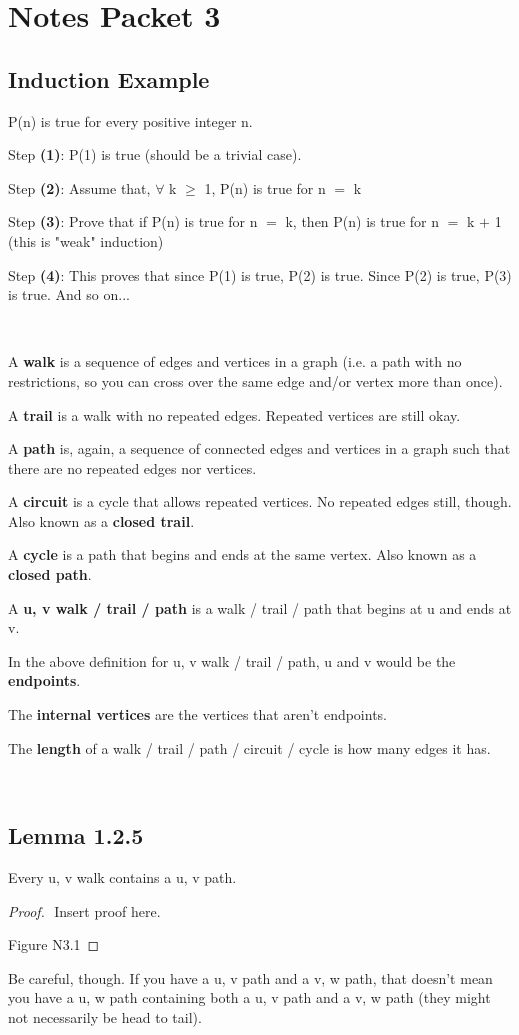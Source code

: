 \documentclass{article}
\newcommand{\mt}[1]{\ensuremath{#1}}
\newcommand\bsc[2][\DefaultOpt]{%
  \def\DefaultOpt{#2}%
  \section[#1]{#2}%
}
\newcommand\ssc[2][\DefaultOpt]{%
  \def\DefaultOpt{#2}%
  \subsection[#1]{#2}%
}
\newcommand{\bgpf}{\begin{proof} $ $\newline}
\newcommand{\bpth}[1]{\textbf{(#1)}}
\newcommand{\epf}{\end{proof}}
\newcommand{\fa}{\mt{\forall} }          %
\newcommand{\ps}{\mt{\operatorname{+}} }
\newcommand{\gre}{\mt{\operatorname{\geq}} }
\newcommand{\eql}{ \mt{\operatorname{=}} }
\begin{document}
\bsc{Notes Packet 3}{
\ssc{Induction Example}{
P(n) is true for every positive integer n.

Step \bpth{1}: P(1) is true (should be a trivial case).

Step \bpth{2}: Assume that, \fa k \gre 1, P(n) is true for n\eql k

Step \bpth{3}: Prove that if P(n) is true for n\eql k, then P(n) is true for n\eql k \ps 1 (this is "weak" induction)

Step \bpth{4}: This proves that since P(1) is true, P(2) is true. Since P(2) is true, P(3) is true. And so on...
}

\

A \textbf{walk} is a sequence of edges and vertices in a graph (i.e. a path with no restrictions, so you can cross over the same edge and/or vertex more than once).

A \textbf{trail} is a walk with no repeated edges. Repeated vertices are still okay.

A \textbf{path} is, again, a sequence of connected edges and vertices in a graph such that there are no repeated edges nor vertices.

A \textbf{circuit} is a cycle that allows repeated vertices. No repeated edges still, though. Also known as a \textbf{closed trail}.

A \textbf{cycle} is a path that begins and ends at the same vertex. Also known as a \textbf{closed path}.

A \textbf{u, v walk / trail / path} is a walk / trail / path that begins at u and ends at v.

In the above definition for u, v walk / trail / path, u and v would be the \textbf{endpoints}.

The \textbf{internal vertices} are the vertices that aren't endpoints.

The \textbf{length} of a walk / trail / path / circuit / cycle is how many edges it has. 

\

\ssc{Lemma 1.2.5}{

Every u, v walk contains a u, v path.

\bgpf
Insert proof here.

Figure N3.1
\epf

Be careful, though. If you have a u, v path and a v, w path, that doesn't mean you have a u, w path containing both a u, v path and a v, w path (they might not necessarily be head to tail).

}

}
\end{document}
